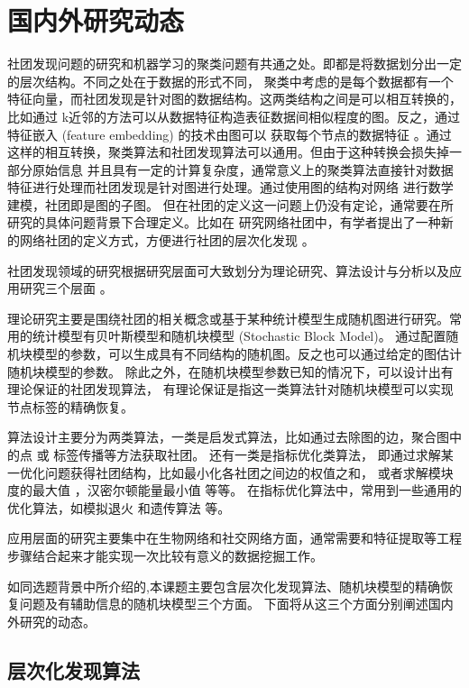 \section{国内外研究动态}
社团发现问题的研究和机器学习的聚类问题有共通之处。即都是将数据划分出一定的层次结构。不同之处在于数据的形式不同，
聚类中考虑的是每个数据都有一个特征向量，而社团发现是针对图的数据结构。这两类结构之间是可以相互转换的，比如通过
k近邻的方法可以从数据特征构造表征数据间相似程度的图。反之，通过特征嵌入 (feature embedding) 的技术由图可以
获取每个节点的数据特征 \cite{hamilton2017representation}。通过这样的相互转换，聚类算法和社团发现算法可以通用。但由于这种转换会损失掉一部分原始信息
并且具有一定的计算复杂度，通常意义上的聚类算法直接针对数据特征进行处理而社团发现是针对图进行处理。通过使用图的结构对网络
进行数学建模，社团即是图的子图。
但在社团的定义这一问题上仍没有定论，通常要在所研究的具体问题背景下合理定义。比如在
研究网络社团中，有学者提出了一种新的网络社团的定义方式，方便进行社团的层次化发现
\cite{alphabetaclustering2019}。

社团发现领域的研究根据研究层面可大致划分为理论研究、算法设计与分析以及应用研究三个层面
\cite{ZJSH201102017}。

理论研究主要是围绕社团的相关概念或基于某种统计模型生成随机图进行研究。常用的统计模型有贝叶斯模型和随机块模型 (Stochastic Block Model)。
通过配置随机块模型的参数，可以生成具有不同结构的随机图。反之也可以通过给定的图估计随机块模型的参数\cite{RJXB201609005}。
除此之外，在随机块模型参数已知的情况下，可以设计出有理论保证的社团发现算法，
有理论保证是指这一类算法针对随机块模型可以实现节点标签的精确恢复。

算法设计主要分为两类算法，一类是启发式算法，比如通过去除图的边\cite{girvan2002community}，聚合图中的点 \cite{clauset2004finding}或
标签传播\cite{raghavan2007near}等方法获取社团。
还有一类是指标优化类算法，
即通过求解某一优化问题获得社团结构，比如最小化各社团之间边的权值之和，
或者求解模块度的最大值 \cite{newman2006modularity}，汉密尔顿能量最小值
\cite{PhysRevLett.93.218701} 等等。
在指标优化算法中，常用到一些通用的优化算法，如模拟退火\cite{PhysRevE.71.046101}
和遗传算法 \cite{pizzuti2008ga}等。

应用层面的研究主要集中在生物网络和社交网络方面，通常需要和特征提取等工程步骤结合起来才能实现一次比较有意义的数据挖掘工作。

如同选题背景中所介绍的,本课题主要包含层次化发现算法、随机块模型的精确恢复问题及有辅助信息的随机块模型三个方面。
下面将从这三个方面分别阐述国内外研究的动态。
\subsection{层次化发现算法}


